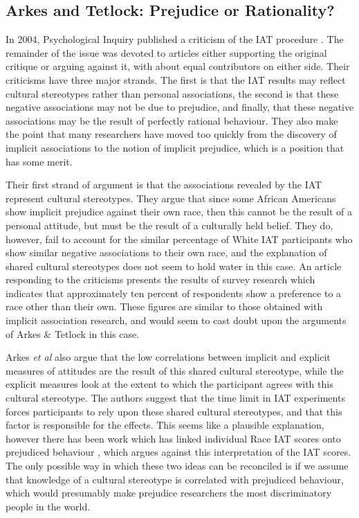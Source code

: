 \subsection{Arkes and Tetlock: Prejudice or Rationality?}

In 2004, Psychological Inquiry published a criticism of the IAT procedure \cite{Arkes2004}. The remainder of the issue was devoted to articles either supporting the original critique or arguing against it, with about equal contributors on either side. Their criticisms have three major strands. The first is that the IAT results may reflect cultural stereotypes rather than personal associations, the second is that these negative associations may not be due to prejudice, and finally, that these negative associations may be the result of perfectly rational behaviour. They also make the point that many researchers have moved too quickly from the discovery of implicit associations to the notion of implicit prejudice, which is a position that has some merit. 

Their first strand of argument is that the associations revealed by the IAT represent cultural stereotypes. They argue that since some African Americans show implicit prejudice against their own race, then this cannot be the result of a personal attitude, but must be the result of a culturally held belief. They do, however, fail to account for the similar percentage of White IAT participants who show similar negative associations to their own race, and the explanation of shared cultural stereotypes does not seem to hold water in this case. An article responding to the criticisms \cite{Sears2004} presents the results of survey research which indicates that approximately ten percent of respondents show a preference to a race other than their own. These figures are similar to those obtained with implicit association research, and would seem to cast doubt upon the arguments of Arkes \& Tetlock in this case. 

Arkes  \textit{et al} also argue that the low correlations between implicit and explicit measures of attitudes are the result of this shared cultural stereotype, while the explicit measures look at the extent to which the participant agrees with this cultural stereotype. The authors suggest that the time limit in IAT experiments forces participants to rely upon these shared cultural stereotypes, and that this factor is responsible for the effects. This seems like a plausible explanation, however there has been work which has linked individual Race IAT scores onto prejudiced behaviour \cite{Heider2007}, which argues against this interpretation of the IAT scores. The only possible way in which these two ideas can be reconciled is if we assume that knowledge of a cultural stereotype is correlated with prejudiced behaviour, which would presumably make prejudice researchers the most discriminatory people in the world. 


